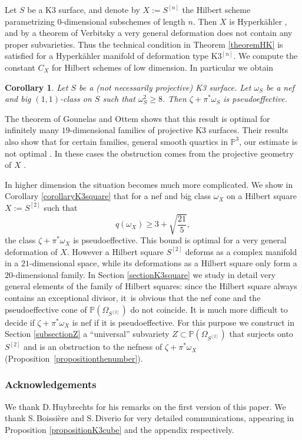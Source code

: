 \documentclass[JEP,XML,SOM,Unicode,NoEqCountersInSection,published]{cedram}
\theoremstyle{plain}
\newtheorem{corollary}[theorem]{Corollary}
\theoremstyle{definition}
\newcommand{\PP}{\ensuremath{\mathbb{P}}}
\begin{document}
Let $S$ be a K3 surface, and denote by $X:=S^{[n]}$ the Hilbert scheme parametrizing $0$-dimensional subschemes
of length $n$. Then $X$ is Hyperkähler \cite{Bea83}, and by a theorem of Verbitsky
\cite[Th.\,1.1]{Ver98} a very general deformation does not contain any proper subvarieties.
Thus the technical condition in Theorem \ref{theoremHK} is satisfied for a Hyperkähler manifold of deformation type K3$^{[n]}$.
We compute the constant $C_X$ for Hilbert schemes of low dimension. In particular we obtain

\begin{corollary} \label{corollaryK3surface}
Let $S$ be a (not necessarily projective) K3 surface.
Let $\omega_S$ be a nef and big $(1,1)$-class on $S$ such that $\omega_S^2 \geq 8$.
Then $\zeta+\pi^*\omega_S$ is pseudoeffective.
\end{corollary}

The theorem of Gounelas and Ottem shows that this result is optimal for infinitely many $19$-dimensional families of projective K3 surfaces. Their results also show that for certain families, \eg general smooth quartics in $\PP^3$, our estimate is not optimal \cite[Cor.\,4.2]{GO18}. In these cases the obstruction comes from the projective geometry of $X$ \cite[\S 4.2]{GO18}.

In higher dimension the situation becomes much more complicated. We show in
Corollary \ref{corollaryK3square} that for a nef and big class $\omega_X$ on a Hilbert square $X:=S^{[2]}$
such that
\[
q(\omega_X)\geq 3+\sqrt{\frac{21}{5}},
\]
the class $\zeta+\pi^*\omega_X$ is pseudoeffective. This bound is optimal
for a very general defor\-ma\-tion of $X$. However a Hilbert square $S^{[2]}$ deforms as a complex manifold in a
$21$\nobreakdash-dimensional space, while its deformations as a Hilbert square only form a $20$\nobreakdash-dimen\-sional family.
In Section \ref{sectionK3square} we study in detail very general elements of the family of Hilbert squares:
since the Hilbert square always contains an exceptional divisor, it~is obvious
that the nef cone and the pseudoeffective cone of $\PP(\Omega_{S^{[2]}})$ do not coincide.
It is much more difficult to decide if $\zeta+\pi^* \omega_X$ is nef if it is pseudoeffective.
For this purpose we construct in Section \ref{subsectionZ} a ``universal''
subvariety $Z \subset \PP(\Omega_{S^{[2]}})$ that surjects onto~$S^{[2]}$ and is an obstruction
to the nefness of $\zeta+\pi^* \omega_X$ (\cf Proposition~\ref{propositionthenumber}).

\subsubsection*{Acknowledgements}
We thank D.\,Huybrechts for his remarks on the first version of this paper.
We thank S.\,Boissière and S.\,Diverio for very detailed communications, appearing in Proposition \ref{propositionK3cube}
and the appendix respectively.
\end{document}
